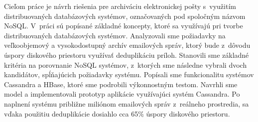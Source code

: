\documentclass[11pt,twoside,a4paper]{book}
\begin{document}
\baselineskip

\noindent
Cieľom práce je návrh riešenia pre archiváciu elektronickej pošty s~využitím distribuovaných databázových systémov, označovaných pod spoločným názvom NoSQL. V~práci sú popísané základné koncepty, ktoré sa využívajú pri tvorbe distribuovaných databázových systémov. Analyzovali sme požiadavky na veľkoobjemový a vysokodostupný archív emailových správ, ktorý bude z~dôvodu úspory diskového priestoru využívať deduplikáciu príloh. Stanovili sme základné kritéria na porovnanie NoSQL systémov, z~ktorých sme následne vybrali dvoch kandidátov, spĺňajúcich požiadavky systému. Popísali sme funkcionalitu systémov Cassandra a HBase, ktoré sme podrobili výkonnostným testom. Navrhli sme model a implementovali prototyp aplikácie využívajúci systém Cassandra. Po naplnení systému približne miliónom emailových správ z~reálneho prostredia, sa vďaka použitiu deduplikácie dosiahlo cca 65\% úspory diskového priestoru.





\end{document}
